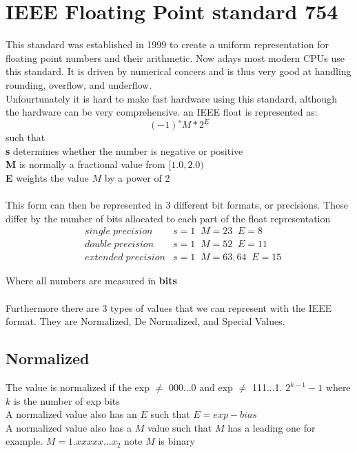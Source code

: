 \documentclass[12pt]{book}
\begin{document}
\section*{IEEE Floating Point standard 754}
This standard was established in 1999 to create a uniform representation
        for floating point numbers and their arithmetic.
Now adays most modern CPUs use this standard.
It is driven by numerical concers and is thus very good at handling rounding, overflow, and underflow.\\
Unfourtunately it is hard to make fast hardware using this standard, 
        although the hardware can be very comprehensive.
\pagebreak
an IEEE float is represented as:
\[(-1)^sM*2^E\]
such that \\
\textbf{s} determines whether the number is negative or positive\\
\textbf{M} is normally a fractional value from $[1.0,2.0)$\\
\textbf{E} weights the value $M$ by a power of 2\\
\paragraph{}
This form can then be represented in 3 different bit formats, or precisions. 
These differ by the number of bits allocated to each part of the float representation \\
\begin{align*}
        &single\;precision       &s=1\;\;M=23\;\;E=8\\
        &double\;precision       &s=1\;\;M=52\;\;E=11\\
        &extended\;precision     &s=1\;\;M=63,64\;\;E=15
\end{align*}

Where all numbers are measured in \textbf{bits}
\paragraph{}
Furthermore there are 3 types of values that we can represent with the IEEE format.
They are Normalized, De Normalized, and Special Values.

\subsection*{Normalized}
The value is normalized if the exp $\neq$ 000...0 and exp $\neq$ 111...1.         
$2^{k-1}-1$ where $k$ is the number of exp bits\\
A normalized value also has an $E$ such that $E=exp-bias$\\
A normalized value also has a $M$ value such that $M$ has a leading one
        for example. $M= 1.xxxxx...x_2$ note $M$ is binary
\end{document}
